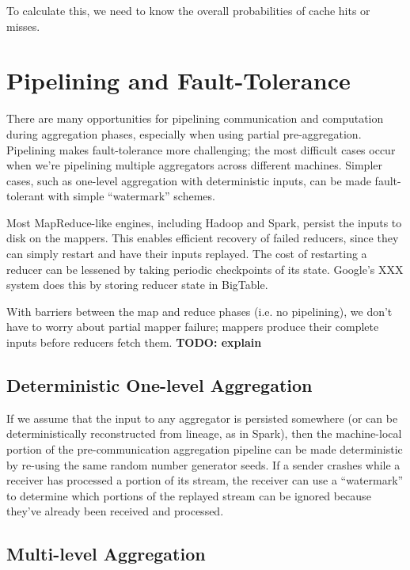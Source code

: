 \documentclass[twocolumn, 10pt]{article}
\begin{document}
To calculate this, we need to know the overall probabilities of cache hits or
misses.





\section{Pipelining and Fault-Tolerance}

There are many opportunities for pipelining communication and computation
during aggregation phases, especially when using partial pre-aggregation.
Pipelining makes fault-tolerance more challenging; the most difficult cases
occur when we're pipelining multiple aggregators across different machines.
Simpler cases, such as one-level aggregation with deterministic inputs,
can be made fault-tolerant with simple ``watermark'' schemes.

Most MapReduce-like engines, including Hadoop and Spark, persist the inputs to
disk on the mappers.  This enables efficient recovery of failed reducers,
since they can simply restart and have their inputs replayed.  The cost of
restarting a reducer can be lessened by taking periodic checkpoints of its
state.  Google's XXX system does this by storing reducer state in BigTable.

With barriers between the map and reduce phases (i.e. no pipelining), we don't
have to worry about partial mapper failure; mappers produce their complete
inputs before reducers fetch them.  \textbf{TODO: explain}



\subsection{Deterministic One-level Aggregation}

If we assume that the input to any aggregator is persisted somewhere (or can
be deterministically reconstructed from lineage, as in Spark), then the
machine-local portion of the pre-communication aggregation pipeline can be
made deterministic by re-using the same random number generator seeds.
If a sender crashes while a receiver has processed a portion of its stream,
the receiver can use a ``watermark'' to determine which portions of the
replayed stream can be ignored because they've already been received and
processed.

\subsection{Multi-level Aggregation}
\end{document}
